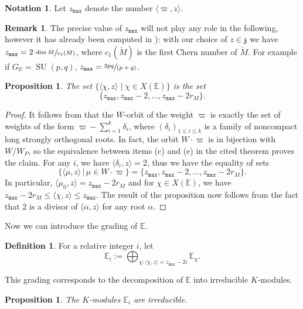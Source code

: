 \documentclass[10pt]{amsart}
\newcommand{\spfrac}[2]{\sfrac{#1}{(#2)}}
\newcommand{\citestar}[3]{\cite[#3]{#1}}
\theoremstyle{plain}
\newtheorem{prop}[theo]{Proposition}
\theoremstyle{definition}
\newtheorem{defi}[theo]{Definition}
\newtheorem{nota}[theo]{Notation}
\newtheorem{rema}[theo]{Remark}
\DeclareMathOperator{\SU}{SU}
\newcommand{\bE}{\mathbb{E}}
\newcommand{\bR}{\mathbb{R}}
\newcommand{\fz}{\mathfrak{z}}
\newcommand{\zmax}{z_{\mathtt{max}}}
\newcommand{\rkm}{{r_M}}
\newcommand{\scal}[1]{\langle #1 \rangle}
\begin{document}

\begin{nota}
Let $\zmax$ denote the number $\scal{\varpi,z}$.
\end{nota}

\begin{rema}
The precise value of $\zmax$ will not play any role in the following, however it has already
been computed in \citestar{KMgeneraltype}*{p.\,214-216}): with our choice of $z\in\fz$ we have
$\zmax=2\,\sfrac{\dim \check{M}}{c_1(\check{M})}$, where $c_1(\check{M})$ is the first Chern number
of $\check{M}$. For example if $G_\bR=\SU(p,q)$, $\zmax=\spfrac{2pq}{p+q}$.
\end{rema}

\begin{prop}
\label{prop:rang}
The set $\{\scal{\chi,z}\mid \chi \in X(\bE) \}$ is the set $$\{\zmax,\zmax-2,\ldots,\zmax-2\rkm\}.$$
\end{prop}
\begin{proof}
It follows from \citestar{richardson}*{Th.\,2.1} that the $W$-orbit of the
weight $\varpi$ is
exactly the set of weights of the form
$\varpi - \sum_{i=1}^k \delta_i$, where $(\delta_i)_{1 \leq i \leq k}$ is a family of noncompact
long strongly orthogonal roots.
In fact, the orbit $W \cdot \varpi$ is in bijection with $W/W_P$, so the equivalence between items
(c) and (e) in the cited
theorem proves the claim.
For any $i$, we have $\scal{\delta_i,z}=2 $, thus we have the equality of sets
$$\{\scal{\mu,z} \, | \, \mu \in W \cdot \varpi \} = \{ \zmax, \zmax-2, \ldots, \zmax-2\rkm \} .$$
In particular, $\scal{\mu_0,z}\!=\!\zmax-2 \rkm$ and for $\chi\!\in\!X(\bE)$, we have
\hbox{$\zmax-2\rkm\!\leq\!\scal{\chi,z} \leq \zmax$}. The result of the proposition now follows from the fact that
$2 $ is a divisor of $\scal{\alpha,z}$ for any root $\alpha$.
\end{proof}

Now we can introduce the grading of $\bE$.

\begin{defi}
\label{defi:Ei}
For a relative integer $i$, let $$\bE_i:= \bigoplus_{\chi: \scal{\chi,z} = \zmax-2 i} \bE_\chi.$$
\end{defi}

This grading corresponds to the decomposition of $\bE$ into irreducible $K$-modules.

\begin{prop}
\label{prop:Ei-irr}
The $K$-modules $\bE_i$ are irreducible.
\end{prop}
\end{document}
